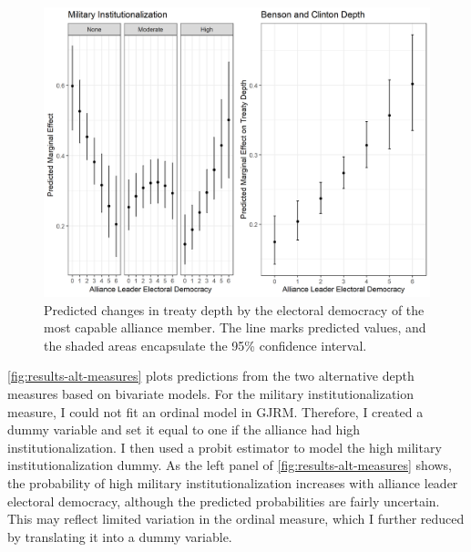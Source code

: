 \documentclass[12pt]{article}
\begin{document}
\begin{figure}
\includegraphics[width=.95\textwidth]{results-alt-measures-sep.png}  
\caption{Predicted changes in treaty depth by the electoral democracy of the most capable alliance member. The line marks predicted values, and the shaded areas encapsulate the 95\% confidence interval.}
\label{fig:results-alt-measures-sep}
\end{figure}


\autoref{fig:results-alt-measures} plots predictions from the two alternative depth measures based on bivariate models. 
For the military institutionalization measure, I could not fit an ordinal model in GJRM.
Therefore, I created a dummy variable and set it equal to one if the alliance had high institutionalization. 
I then used a probit estimator to model the high military institutionalization dummy. 
As the left panel of \autoref{fig:results-alt-measures} shows, the probability of high military institutionalization increases with alliance leader electoral democracy, although the predicted probabilities are fairly uncertain. 
This may reflect limited variation in the ordinal measure, which I further reduced by translating it into a dummy variable. 
\end{document}
